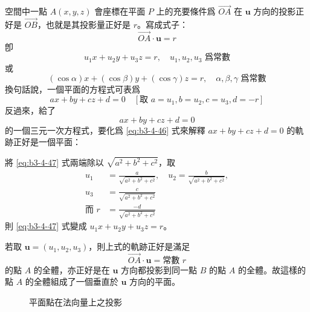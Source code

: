 空間中一點 $A(x, y, z)$ 會座標在平面 $P$ 上的充要條件爲 $\vec{OA}$ 在 $\mathbf{u}$ 方向的投影正好是 $\vec{OB}$，也就是其投影量正好是 $r$。寫成式子：
\[
\vec{OA} \cdot \mathbf{u} = r
\]
卽
\begin{equation}
u_1 x + u_2 y + u_3 z = r, \quad u_1, u_2, u_3 \text{ 爲常數}
\label{eq:b3-4-45}
\end{equation}
或
\begin{equation}
(\cos\alpha)x + (\cos\beta)y + (\cos\gamma)z = r, \quad \alpha, \beta, \gamma \text{ 爲常數}
\label{eq:b3-4-46}
\end{equation}
換句話說，一個平面的方程式可表爲
\[
ax + by + cz + d = 0 \quad [\text{取 } a=u_1, b=u_2, c=u_3, d=-r]
\]
反過來，給了
\begin{equation}
ax + by + cz + d = 0
\label{eq:b3-4-47}
\end{equation}
的一個三元一次方程式，要化爲 \eqref{eq:b3-4-46} 式來解釋 $ax + by + cz + d = 0$ 的軌跡正好是一個平面：

將 \eqref{eq:b3-4-47} 式兩端除以 $\sqrt{a^2 + b^2 + c^2}$，取
\begin{equation}
\begin{aligned}
u_1 &= \frac{a}{\sqrt{a^2 + b^2 + c^2}}, \quad u_2 = \frac{b}{\sqrt{a^2 + b^2 + c^2}}, \\
u_3 &= \frac{c}{\sqrt{a^2 + b^2 + c^2}} \\
\text{而 } r &= \frac{-d}{\sqrt{a^2 + b^2 + c^2}}
\end{aligned}
\label{eq:b3-4-48}
\end{equation}
則 \eqref{eq:b3-4-47} 式變成 $u_1 x + u_2 y + u_3 z = r$。

若取 $\mathbf{u} = (u_1, u_2, u_3)$，則上式的軌跡正好是滿足
\[
\vec{OA} \cdot \mathbf{u} = \text{常數 } r
\]
的點 $A$ 的全體，亦正好是在 $\mathbf{u}$ 方向都投影到同一點 $B$ 的點 $A$ 的全體。故這樣的點 $A$ 的全體組成了一個垂直於 $\mathbf{u}$ 方向的平面。

\begin{figure}[H]
\centering
{}
\caption{平面點在法向量上之投影}
\label{fig:4-67}
\end{figure}

